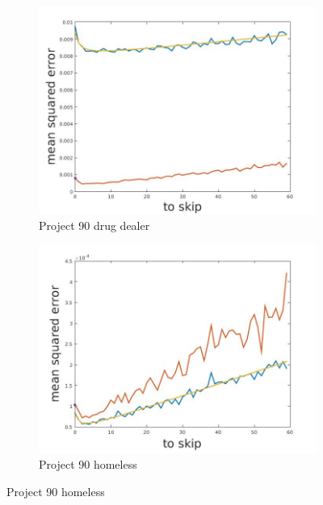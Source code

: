 \documentclass[12pt]{report}
\begin{document}
\begin{figure}[h]
\begin{subfigure}[b]{0.3\textwidth}
    \end{subfigure}
    ~
    \begin{subfigure}[b]{0.3\textwidth}
        \includegraphics[width=\textwidth]{estimators_drugDealer}
        \caption{ Project 90 drug dealer }

    \end{subfigure}
    
    
    \begin{subfigure}[b]{0.3\textwidth}
        \includegraphics[width=\textwidth]{estimators_homeless}
        \caption{ Project 90 homeless}


\end{subfigure}
\end{figure}
\end{document}
